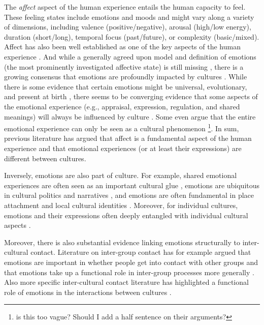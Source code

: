 \documentclass[nobib]{tufte-handout}
\begin{document}
The \textit{affect} aspect of the human experience entails the human capacity to feel. These feeling states include emotions and moods and might vary along a variety of dimensions, including valence (positive/negative), arousal (high/low energy), duration (short/long), temporal focus (past/future), or complexity (basic/mixed). Affect has also been well established as one of the key aspects of the human experience \citep{FeldmanBarrett2007}. And while a generally agreed upon model and definition of emotions (the most prominently investigated affective state) is still missing \citep[e.g.,][]{Scarantino2016}, there is a growing consensus that emotions are profoundly impacted by cultures \citep[e.g.,][]{Holodynski2012}. While there is some evidence that certain emotions might be universal, evolutionary, and present at birth \citep[e.g.,][]{Ekman1999, FeldmanBarrett2006}, there seems to be converging evidence that some aspects of the emotional experience (e.g., appraisal, expression, regulation, and shared meanings) will always be influenced by culture \citep[][]{Holodynski2012, Matsumoto2012, Kitayama2006}. Some even argue that the entire emotional experience can only be seen as a cultural phenomenon \citep[e.g.,][]{Mesquita2003, Boiger2018}\footnote{is this too vague? Should I add a half sentence on their arguments?}. In sum, previous literature has argued that affect is a fundamental aspect of the human experience and that emotional experiences (or at least their expressions) are different between cultures.

Inversely, emotions are also part of culture. For example, shared emotional experiences are often seen as an important cultural glue \citep{Rensmann2004, Kitayama1994}, emotions are ubiquitous in cultural politics and narratives \citep{Ahmed2014}, and emotions are often fundamental in place attachment and local cultural identities \citep{Smith2016c}. Moreover, for individual cultures, emotions and their expressions often deeply entangled with individual cultural aspects \citep[e.g., see][for a discussion of how different emotions lay at the heart of Chinese cultural elements]{Sundararajan2015}. 

Moreover, there is also substantial evidence linking emotions structurally to inter-cultural contact. Literature on inter-group contact has for example argued that emotions are important in whether people get into contact with other groups \citep{Esses2002} and that emotions take up a functional role in inter-group processes more generally \citep{Iyer2008}. Also more specific inter-cultural contact literature has highlighted a functional role of emotions in the interactions between cultures \citep[e.g.,][]{Stephan1992}.
\end{document}
